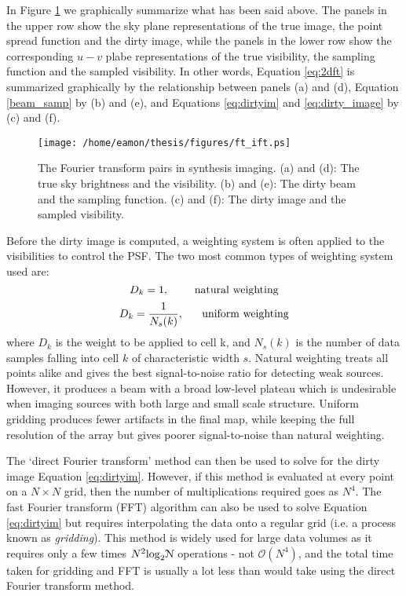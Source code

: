 In Figure \ref{fig2j} we graphically summarize what has been said above. The panels in the upper row show the sky plane representations of the true image, the point spread function and the dirty image, while the panels in the lower row show the corresponding $u-v$ plabe representations of the true visibility, the sampling function and the sampled visibility. In other words, Equation \ref{eq:2dft} is summarized graphically by the relationship between panels (a) and (d),  Equation \ref{beam_samp} by (b) and (e), and Equations \ref{eq:dirtyim} and \ref{eq:dirty_image} by (c) and (f).

\begin{figure}[hbt!]
\centering 
          \texttt{[image: /home/eamon/thesis/figures/ft\_ift.ps]}
\caption[The Fourier transform pairs in synthesis imaging.]{The Fourier transform pairs in synthesis imaging. (a) and (d): The true sky brightness and the visibility. (b) and (e): The dirty beam and the sampling function. (c) and (f): The dirty image and the sampled visibility.}
\label{fig2j}
\end{figure}

Before the dirty image is computed, a weighting system is often applied to the visibilities to control the PSF. The two most common types of weighting system used are:
\begin{equation}
D_{k}=1,	\ \ \ \ \ \ \ \rm{natural \ weighting}
\end{equation}
\begin{equation}
D_{k}=\frac{1}{N_{s}(k)}, \ \ \ \ \ \rm{uniform \ weighting}
\end{equation}
where $D_{k}$ is the weight to be applied to cell k, and ${N_{s}(k)}$ is the number of data samples falling into cell $k$ of characteristic width $s$. Natural weighting treats all points alike and gives the best signal-to-noise ratio for detecting weak sources. However, it produces a beam with a broad low-level plateau which is undesirable when imaging sources with both large and small scale structure. Uniform gridding produces fewer artifacts in the final map, while keeping the full resolution of the array but gives poorer signal-to-noise than natural weighting.

The `direct Fourier transform' method can then be used to solve for the dirty image Equation \ref{eq:dirtyim}. However, if this method is evaluated at every point on a $N\times N$ grid, then the number of multiplications required goes as $N^{4}$. The fast Fourier transform (FFT) algorithm can also be used to solve Equation \ref{eq:dirtyim} but requires interpolating the data onto a regular grid (i.e. a process known as \textit{gridding}). This method is widely used for large data volumes as it requires only a few times $N^{2}\rm{log}_{2}\mathcal{N}$ operations - not $\mathcal{O}(N^4)$, and the total time taken for gridding and FFT is usually a lot less than would take using the direct Fourier transform method.

